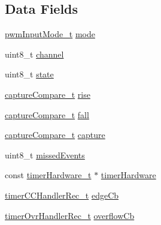 \subsection*{Data Fields}
\begin{DoxyCompactItemize}
\item 
\hyperlink{pwm__rx_8c_a831215ac146f5a9dac5a4af0060fe09a}{pwm\+Input\+Mode\+\_\+t} \hyperlink{structpwmInputPort__t_ae9f4ba92912b5f730c1e0c417c12c05e}{mode}
\item 
uint8\+\_\+t \hyperlink{structpwmInputPort__t_ad6742034ab1f3ed92d8e514c494449e8}{channel}
\item 
uint8\+\_\+t \hyperlink{structpwmInputPort__t_a2e33ec4ef4817f2005980594f413008c}{state}
\item 
\hyperlink{timer_8h_a77d697db0790a59987ec953a39e2329f}{capture\+Compare\+\_\+t} \hyperlink{structpwmInputPort__t_a36ed724daac84e1fdff43f3dbace1569}{rise}
\item 
\hyperlink{timer_8h_a77d697db0790a59987ec953a39e2329f}{capture\+Compare\+\_\+t} \hyperlink{structpwmInputPort__t_a19336fbf927cd4c009fc97b35688af0b}{fall}
\item 
\hyperlink{timer_8h_a77d697db0790a59987ec953a39e2329f}{capture\+Compare\+\_\+t} \hyperlink{structpwmInputPort__t_aad57834b67baf96db01f0d45eb1f0c62}{capture}
\item 
uint8\+\_\+t \hyperlink{structpwmInputPort__t_a364ea2358272204c6a2b3a3bccd2b680}{missed\+Events}
\item 
const \hyperlink{timer_8h_a7a6521811f99a8d6a00ba58ba4b5ee57}{timer\+Hardware\+\_\+t} $\ast$ \hyperlink{structpwmInputPort__t_a9bc8732db80b1422b581d537c2d23598}{timer\+Hardware}
\item 
\hyperlink{timer_8h_ae46420e9784a27eb4d9769ea453ac9cd}{timer\+C\+C\+Handler\+Rec\+\_\+t} \hyperlink{structpwmInputPort__t_a0468857c1752cc638ee9646259d40dff}{edge\+Cb}
\item 
\hyperlink{timer_8h_a20efe19715701da0b5e7942daf6f9728}{timer\+Ovr\+Handler\+Rec\+\_\+t} \hyperlink{structpwmInputPort__t_a144abb430bf38e93db011a43ab16a414}{overflow\+Cb}
\end{DoxyCompactItemize}


